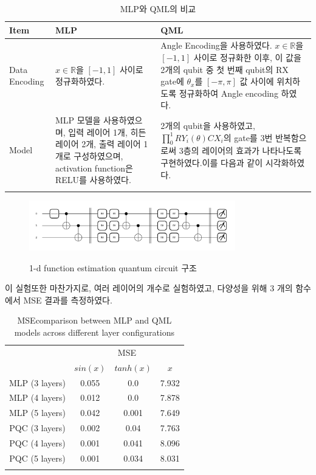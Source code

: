 \begin{itemize}
\begin{table}[ht]
    \centering
    \begin{tabular}{ l||p{5.5cm}||p{5.5cm}}
    \Xhline{3\arrayrulewidth}
    \textbf{Item} & \textbf{MLP} & \textbf{QML} \\
    \hline
    Data Encoding & $x \in \mathbb{R}$을 $[-1, 1]$ 사이로 정규화하였다. &
    Angle Encoding을 사용하였다. $x \in \mathbb{R}$을 $[-1, 1]$ 사이로 정규화한 이후, 이 값을 2개의 qubit 중 첫 번째 qubit의 RX gate에 $\theta_x$를 $[-\pi, \pi]$ 값 사이에 위치하도록 정규화하여 Angle encoding 하였다. \\
    \hline
    Model & MLP 모델을 사용하였으며, 입력 레이어 1개, 히든 레이어 2개, 출력 레이어 1개로 구성하였으며, activation function은 RELU를 사용하였다. &
    2개의 qubit을 사용하였고, $\prod_{0}^{1} RY_i(\theta)CX_i$의 gate를 3번 반복함으로써 3층의 레이어의 효과가 나타나도록 구현하였다.이를 다음과 같이 시각화하였다.{fig:1d-image} \\
    \Xhline{3\arrayrulewidth}
    \end{tabular}
    \caption{MLP와 QML의 비교}
    \label{tab:mlp_qml_comparison_1d}
\end{table}

\begin{figure}[h]
    \centering
    \includegraphics[width=0.8\textwidth]{figs/pqc_1d}\
\caption{1-d function estimation quantum circuit 구조}
\label{fig:1d-image}
\end{figure}
\end{itemize}
\clearpage

이 실험또한 마찬가지로, 여러 레이어의 개수로 실험하였고, 다양성을 위해 3 개의 함수에서 MSE  결과를 측정하였다.

\begin{table}[ht]
    \centering
    \begin{tabular}{c|ccc}
    \Xhline{3\arrayrulewidth}
    \multirow{2}{*}{Layers} & \multicolumn{3}{c}{MSE} \\
    \cline{2-4}
    & $sin(x)$  & $tanh(x)$ & $x$ \\
    \hline
    MLP (3 layers) & 0.055 & 0.0 & 7.932 \\
    MLP (4 layers) & 0.012 & 0.0 & 7.878 \\
    MLP (5 layers) & 0.042 & 0.001 & 7.649 \\
    \hline
    PQC (3 layers) & 0.002 & 0.04 & 7.763 \\
    PQC (4 layers) & 0.001 & 0.041 & 8.096 \\
    PQC (5 layers) & 0.001 & 0.034 & 8.031 \\
    \Xhline{3\arrayrulewidth}
    \end{tabular}
    \caption{MSEcomparison between MLP and QML models across different layer configurations}
    \label{tab:mse_comparison}
\end{table}




